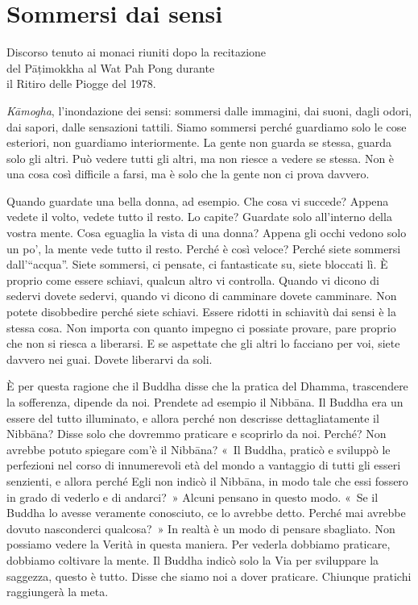 \chapter{Sommersi dai sensi}

\begin{openingQuote}
  \centering

  Discorso tenuto ai monaci riuniti dopo la recitazione\\
  del Pāṭimokkha al Wat Pah Pong durante\\
  il Ritiro delle Piogge del 1978.
\end{openingQuote}

\emph{Kāmogha}, l'inondazione dei sensi: sommersi dalle immagini, dai
suoni, dagli odori, dai sapori, dalle sensazioni tattili. Siamo sommersi
perché guardiamo solo le cose esteriori, non guardiamo interiormente. La
gente non guarda se stessa, guarda solo gli altri. Può vedere tutti gli
altri, ma non riesce a vedere se stessa. Non è una cosa così difficile a
farsi, ma è solo che la gente non ci prova davvero.

Quando guardate una bella donna, ad esempio. Che cosa vi succede? Appena
vedete il volto, vedete tutto il resto. Lo capite? Guardate solo
all'interno della vostra mente. Cosa eguaglia la vista di una donna?
Appena gli occhi vedono solo un po', la mente vede tutto il resto.
Perché è così veloce? Perché siete sommersi dall'``acqua''. Siete
sommersi, ci pensate, ci fantasticate su, siete bloccati lì. È proprio
come essere schiavi, qualcun altro vi controlla. Quando vi dicono di
sedervi dovete sedervi, quando vi dicono di camminare dovete camminare.
Non potete disobbedire perché siete schiavi. Essere ridotti in schiavitù
dai sensi è la stessa cosa. Non importa con quanto impegno ci possiate
provare, pare proprio che non si riesca a liberarsi. E se aspettate che
gli altri lo facciano per voi, siete davvero nei guai. Dovete liberarvi
da soli.

È per questa ragione che il Buddha disse che la pratica del Dhamma,
trascendere la sofferenza, dipende da noi. Prendete ad esempio il
Nibbāna. Il Buddha era un essere del tutto illuminato, e allora
perché non descrisse dettagliatamente il Nibbāna? Disse solo che
dovremmo praticare e scoprirlo da noi. Perché? Non avrebbe potuto
spiegare com'è il Nibbāna? «~Il Buddha, praticò e sviluppò le
perfezioni nel corso di innumerevoli età del mondo a vantaggio di tutti
gli esseri senzienti, e allora perché Egli non indicò il Nibbāna,
in modo tale che essi fossero in grado di vederlo e di andarci?~» Alcuni
pensano in questo modo. «~Se il Buddha lo avesse veramente conosciuto,
ce lo avrebbe detto. Perché mai avrebbe dovuto nasconderci qualcosa?~»
In realtà è un modo di pensare sbagliato. Non possiamo vedere la Verità
in questa maniera. Per vederla dobbiamo praticare, dobbiamo coltivare la
mente. Il Buddha indicò solo la Via per sviluppare la saggezza, questo è
tutto. Disse che siamo noi a dover praticare. Chiunque pratichi
raggiungerà la meta.

